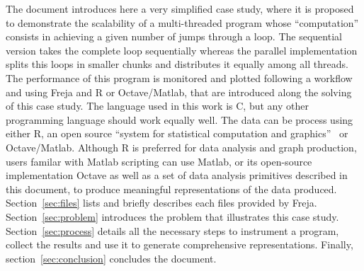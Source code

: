 The document introduces here a very simplified case study, where it is proposed to demonstrate the scalability of a multi-threaded program whose ``computation'' consists in achieving a given number of jumps through a loop. The sequential version takes the complete loop sequentially whereas the parallel implementation splits this loops in smaller chunks and distributes it equally among all threads. The performance of this program is monitored and plotted following a workflow and using Freja and R or Octave/Matlab, that are introduced along the solving of this case study. The language used in this work is {C}, but any other programming language should work equally well. The data can be process using either R, an open source ``system for statistical computation and graphics''~\cite{hornik14} or Octave/Matlab. Although R is preferred for data analysis and graph production, users familar with Matlab scripting can use Matlab, or its open-source implementation Octave as well as a set of data analysis primitives described in this document, to produce meaningful representations of the data produced. Section~\ref{sec:files} lists and briefly describes each files provided by Freja. Section~\ref{sec:problem} introduces the problem that illustrates this case study. Section~\ref{sec:process} details all the necessary steps to instrument a program, collect the results and use it to generate comprehensive representations. Finally, section~\ref{sec:conclusion} concludes the document.


